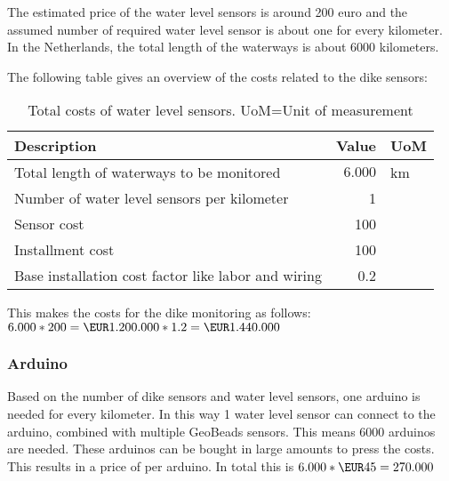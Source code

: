The estimated price of the water level sensors is around 200 euro and the assumed number of required water level sensor is about one for every kilometer. In the Netherlands, the total length of the waterways is about $6000$ kilometers\cite{cbs-waterways}.

The following table gives an overview of the costs related to the dike sensors:

\begin{table}[H]

	\centering
	\begin{tabular}{lrl}
	\toprule
	\textbf{Description} & \multicolumn{1}{l}{\textbf{Value}} & \textbf{UoM} \\ \hline
	Total length of waterways to be monitored & $6.000$ & km \\
	Number of water level sensors per kilometer & 1 & \\
	Sensor cost & 100 & \EUR{} \\
	Installment cost & 100 &\EUR{} \\
	Base installation cost factor like labor and wiring & 0.2 & \\
	\bottomrule
	\end{tabular}
	\label{table:total-dev-costs3} 
	\caption{Total costs of water level sensors. UoM=Unit of measurement}
\end{table}

This makes the costs for the dike monitoring as follows: \\
$ 6.000 * 200 = \EUR1.200.000 * 1.2 = \EUR1.440.000$\\

\subsubsection{Arduino}
Based on the number of dike sensors and water level sensors, one arduino is needed for every kilometer. In this way 1 water level sensor can connect to the arduino, combined with multiple GeoBeads sensors. This means 6000 arduinos are needed. These arduinos can be bought in large amounts to press the costs. This results in a price of  per arduino. In total this is $6.000 * \EUR45 = 270.000$

